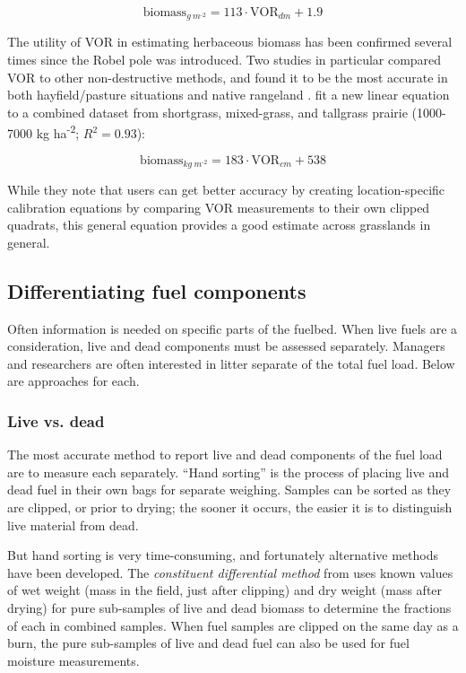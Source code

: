 \begin{equation}\label{eq:robel1}
\text{biomass}_{g~m^{\text{-}2}} =  113 \cdot \text{VOR}_{dm} + 1.9
\end{equation}

The utility of VOR in estimating herbaceous biomass has been confirmed several times since the Robel pole was introduced. 
Two studies in particular compared VOR to other non-destructive methods, and found it to be the most accurate in both hayfield/pasture situations and native rangeland \citep{harmoney1997, ganguli2000}. 
\citet{vermeire2002} fit a new linear equation to a combined dataset from shortgrass, mixed-grass, and tallgrass prairie (1000-7000 kg ha\textsuperscript{-2}; $R^2 = 0.93$):

\begin{equation}\label{eq:robel2}
	\text{biomass}_{kg~m^{\text{-}2}} =  183 \cdot \text{VOR}_{cm} + 538
\end{equation}

While they note that users can get better accuracy by creating location-specific calibration equations by comparing VOR measurements to their own clipped quadrats, this general equation provides a good estimate across grasslands in general. 

\subsection{Differentiating fuel components} 

Often information is needed on specific parts of the fuelbed. 
When live fuels are a consideration, live and dead components must be assessed separately. 
Managers and researchers are often interested in litter separate of the total fuel load. 
Below are approaches for each. 

\subsubsection{Live vs. dead}

The most accurate method to report live and dead components of the fuel load are to measure each separately. 
``Hand sorting'' is the process of placing live and dead fuel in their own bags for separate weighing. 
Samples can be sorted as they are clipped, or prior to drying; the sooner it occurs, the easier it is to distinguish live material from dead. 

But hand sorting is very time-consuming, and fortunately alternative methods have been developed. 
The \emph{constituent differential method} from \citet{gillen1993} uses known values of wet weight (mass in the field, just after clipping) and dry weight (mass after drying) for pure sub-samples of live and dead biomass to determine the fractions of each in combined samples.
When fuel samples are clipped on the same day as a burn, the pure sub-samples of live and dead fuel can also be used for fuel moisture measurements.

